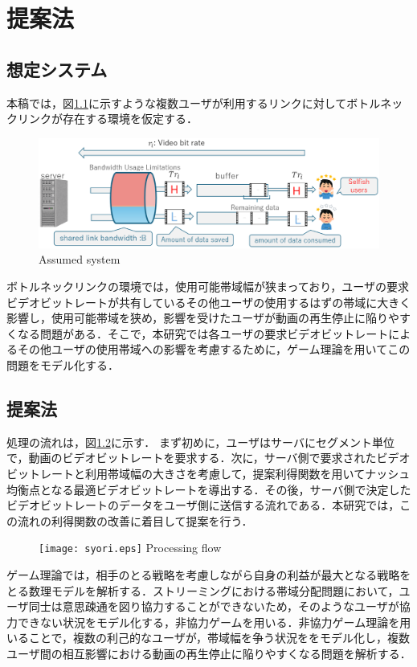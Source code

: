 \chapter{提案法}
\section{想定システム}
本稿では，図\ref{fig:soutei}に示すような複数ユーザが利用するリンクに対してボトルネックリンクが存在する環境を仮定する．
\begin{figure}[hh]
\centering
\includegraphics[scale=0.3]{sisutemu.eps}
%
            {Assumed system}
\label{fig:soutei}
\end{figure}
ボトルネックリンクの環境では，使用可能帯域幅が狭まっており，ユーザの要求ビデオビットレートが共有しているその他ユーザの使用するはずの帯域に大きく影響し，使用可能帯域を狭め，影響を受けたユーザが動画の再生停止に陥りやすくなる問題がある．そこで，本研究では各ユーザの要求ビデオビットレートによるその他ユーザの使用帯域への影響を考慮するために，ゲーム理論を用いてこの問題をモデル化する．

\section{提案法}
処理の流れは，図\ref{fig:syori}に示す\cite{motomoto}．
まず初めに，ユーザはサーバにセグメント単位で，動画のビデオビットレートを要求する．次に，サーバ側で要求されたビデオビットレートと利用帯域幅の大きさを考慮して，提案利得関数を用いてナッシュ均衡点となる最適ビデオビットレートを導出する．その後，サーバ側で決定したビデオビットレートのデータをユーザ側に送信する流れである．本研究では，この流れの利得関数の改善に着目して提案を行う．

\begin{figure}[hh]
\centering
\texttt{[image: syori.eps]}
%
            {Processing flow}
    \label{fig:syori}
\end{figure}

ゲーム理論では，相手のとる戦略を考慮しながら自身の利益が最大となる戦略をとる数理モデルを解析する．ストリーミングにおける帯域分配問題において，ユーザ同士は意思疎通を図り協力することができないため，そのようなユーザが協力できない状況をモデル化する，非協力ゲームを用いる．非協力ゲーム理論を用いることで，複数の利己的なユーザが，帯域幅を争う状況ををモデル化し，複数ユーザ間の相互影響における動画の再生停止に陥りやすくなる問題を解析する．

